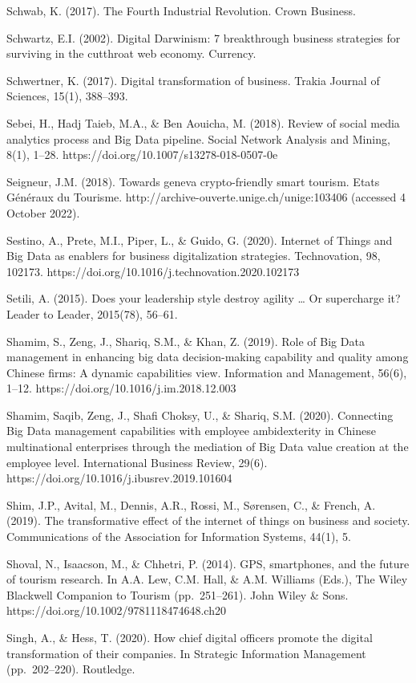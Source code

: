 \documentclass[
  letterpaper,
  DIV=11,
  numbers=noendperiod]{scrreprt}
\begin{document}
Schwab, K. (2017). The Fourth Industrial Revolution. Crown Business.

Schwartz, E.I. (2002). Digital Darwinism: 7 breakthrough business
strategies for surviving in the cutthroat web economy. Currency.

Schwertner, K. (2017). Digital transformation of business. Trakia
Journal of Sciences, 15(1), 388--393.

Sebei, H., Hadj Taieb, M.A., \& Ben Aouicha, M. (2018). Review of social
media analytics process and Big Data pipeline. Social Network Analysis
and Mining, 8(1), 1--28. https://doi.org/10.1007/s13278-018-0507-0e

Seigneur, J.M. (2018). Towards geneva crypto-friendly smart tourism.
Etats Généraux du Tourisme. http://archive-ouverte.unige.ch/unige:103406
(accessed 4 October 2022).

Sestino, A., Prete, M.I., Piper, L., \& Guido, G. (2020). Internet of
Things and Big Data as enablers for business digitalization strategies.
Technovation, 98, 102173.
https://doi.org/10.1016/j.technovation.2020.102173

Setili, A. (2015). Does your leadership style destroy agility \ldots{}
Or supercharge it? Leader to Leader, 2015(78), 56--61.

Shamim, S., Zeng, J., Shariq, S.M., \& Khan, Z. (2019). Role of Big Data
management in enhancing big data decision-making capability and quality
among Chinese firms: A dynamic capabilities view. Information and
Management, 56(6), 1--12. https://doi.org/10.1016/j.im.2018.12.003

Shamim, Saqib, Zeng, J., Shafi Choksy, U., \& Shariq, S.M. (2020).
Connecting Big Data management capabilities with employee ambidexterity
in Chinese multinational enterprises through the mediation of Big Data
value creation at the employee level. International Business Review,
29(6). https://doi.org/10.1016/j.ibusrev.2019.101604

Shim, J.P., Avital, M., Dennis, A.R., Rossi, M., Sørensen, C., \&
French, A. (2019). The transformative effect of the internet of things
on business and society. Communications of the Association for
Information Systems, 44(1), 5.

Shoval, N., Isaacson, M., \& Chhetri, P. (2014). GPS, smartphones, and
the future of tourism research. In A.A. Lew, C.M. Hall, \& A.M. Williams
(Eds.), The Wiley Blackwell Companion to Tourism (pp.~251--261). John
Wiley \& Sons. https://doi.org/10.1002/9781118474648.ch20

Singh, A., \& Hess, T. (2020). How chief digital officers promote the
digital transformation of their companies. In Strategic Information
Management (pp.~202--220). Routledge.
\end{document}
